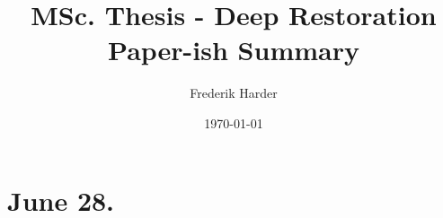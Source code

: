 \documentclass{article}
\title{MSc. Thesis - Deep Restoration\\Paper-ish Summary}
\date{\today}
\author{Frederik Harder}
\begin{document}
\maketitle

\section{June 28.}
\end{document}
